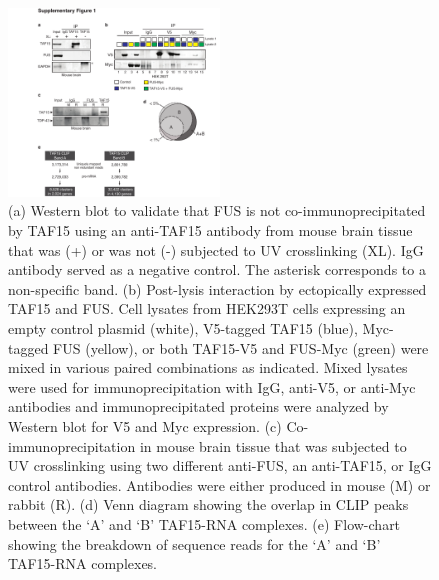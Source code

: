 \begin{figure}[ht]
  \centering
  \includegraphics[width=0.5\textwidth]{chapter_2_figures/Figure_S1}
  \caption[Supplementary Figure 1. CLIP-seq for TAF15 in the mouse brain.]{(a) Western blot to validate that FUS is not co-immunoprecipitated by TAF15 using an anti-TAF15 antibody from mouse brain tissue that was (+) or was not (-) subjected to UV crosslinking (XL). IgG antibody served as a negative control. The asterisk corresponds to a non-specific band. (b) Post-lysis interaction by ectopically expressed TAF15 and FUS. Cell lysates from HEK293T cells expressing an empty control plasmid (white), V5-tagged TAF15 (blue), Myc-tagged FUS (yellow), or both TAF15-V5 and FUS-Myc (green) were mixed in various paired combinations as indicated. Mixed lysates were used for immunoprecipitation with IgG, anti-V5, or anti-Myc antibodies and immunoprecipitated proteins were analyzed by Western blot for V5 and Myc expression. (c) Co-immunoprecipitation in mouse brain tissue that was subjected to UV crosslinking using two different anti-FUS, an anti-TAF15, or IgG control antibodies. Antibodies were either produced in mouse (M) or rabbit (R). (d) Venn diagram showing the overlap in CLIP peaks between the ‘A’ and ‘B’ TAF15-RNA complexes. (e) Flow-chart showing the breakdown of sequence reads for the ‘A’ and ‘B’ TAF15-RNA complexes.}
  \label{fig:Figure_S1}
\end{figure}


